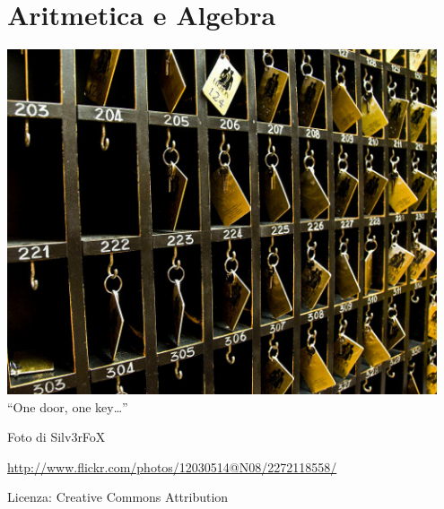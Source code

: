
\part{Aritmetica e Algebra}

  \begin{center}
\includegraphics[width=0.95\textwidth]{img/onedoor.jpg}
    {\large ``One door, one key\ldots''}\par
    Foto di Silv3rFoX\par
    \url{http://www.flickr.com/photos/12030514@N08/2272118558/}\par
    Licenza: Creative Commons Attribution\par
  \end{center}
\cleardoublepage
